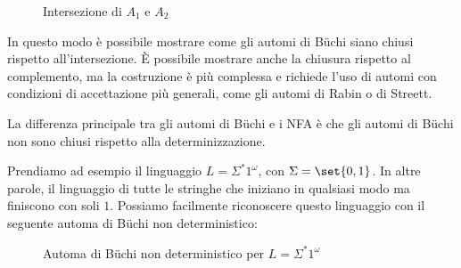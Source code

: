 \begin{figure}[H]
  \centering
  \caption{Intersezione di \(A_1\) e \(A_2\)}\label{fig:buchi_correct_intersection}
\end{figure}

In questo modo è possibile mostrare come gli automi di Büchi siano chiusi rispetto all'intersezione. È possibile mostrare anche la chiusura rispetto al complemento, ma la costruzione è più complessa e richiede l'uso di automi con condizioni di accettazione più generali, come gli automi di Rabin o di Streett.

La differenza principale tra gli automi di Büchi e i NFA è che gli automi di Büchi non sono chiusi rispetto alla determinizzazione.

 Prendiamo ad esempio il linguaggio \(L = \Sigma^* 1^\omega\), con \(\Sigma= \set{0,1}\). In altre parole, il linguaggio di tutte le stringhe che iniziano in qualsiasi modo ma finiscono con soli \(1\). Possiamo facilmente riconoscere questo linguaggio con il seguente automa di Büchi non deterministico:

\begin{figure}[H]
  \centering
  \caption{Automa di Büchi non deterministico per \(L = \Sigma^*1^\omega\)}\label{fig:buchi_sigma_star_one_omega}
\end{figure}

